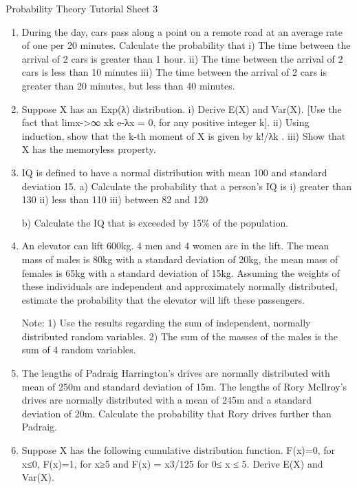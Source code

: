 \documentclass[]{report}
\begin{document}
	Probability Theory
	Tutorial Sheet 3
\begin{enumerate}	
\item During the day, cars pass along a point on a remote road at an average rate of one per 20 minutes. Calculate the probability that 
	i)	The time between the arrival of 2 cars is greater than 1 hour.
	ii)	The time between the arrival of 2 cars is less than 10 minutes 
	iii)	The time between the arrival of 2 cars is greater than 20 minutes, but less than 40 minutes. 
	
\item 	Suppose X has an Exp(λ) distribution.
	i)	Derive E(X) and Var(X). [Use the fact that limx->∞ xk e-λx = 0, for any positive integer k].
	ii)	Using induction, show that the k-th moment of X is given by k!/λk .
	iii) 	      Show that X has the memoryless property.
	

	
\item IQ  is defined to have a normal distribution with mean 100 and standard deviation 15. 
	a) Calculate the probability that a person’s IQ is
	i) greater than 130
	ii) less than 110
	iii) between 82 and 120
	
	b) Calculate the IQ that is exceeded by 15\% of the population.
	
\item  An elevator can lift 600kg. 4 men and 4 women are in the lift. The mean mass of males is 80kg with a standard deviation of 20kg, the mean mass of females is 65kg with a standard deviation of 15kg. Assuming the weights of these individuals are independent and approximately normally distributed, estimate the probability that the elevator will lift these passengers. 
	
	Note: 1) Use the results regarding the sum of independent, normally distributed random variables. 
	2)	The sum of the masses of the males is the sum of 4 random variables.
	
\item 	The lengths of Padraig Harrington's drives are normally distributed with mean of 250m and standard deviation of 15m. The lengths of Rory McIlroy's drives are normally distributed with a mean of 245m and a standard deviation of 20m. Calculate the probability that Rory drives further than Padraig.
	
\item 	Suppose X has the following cumulative distribution function. F(x)=0, for x≤0, 
	F(x)=1, for x≥5 and F(x) = x3/125 for 0≤ x ≤ 5. Derive E(X) and Var(X).
	

\end{enumerate}
\end{document}
